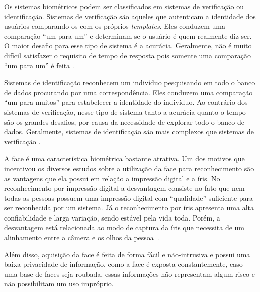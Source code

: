 Os sistemas biométricos podem ser classificados em sistemas de verificação ou identificação. Sistemas de verificação são aqueles que autenticam a identidade dos usuários comparando-os com os próprios \textit{templates}. Eles conduzem uma comparação ``um para um'' e determinam se o usuário é quem realmente diz ser. O maior desafio para esse tipo de sistema é a acurácia. Geralmente, não é muito difícil satisfazer o requisito de tempo de resposta pois somente uma comparação ``um para um'' é feita \cite{hong}.

Sistemas de identificação reconhecem um indivíduo pesquisando em todo o banco de dados procurando por uma correspondência. Eles conduzem uma comparação ``um para muitos'' para estabelecer a identidade do indivíduo. Ao contrário dos sistemas de verificação, nesse tipo de sistema tanto a acurácia quanto o tempo são os grandes desafios, por causa da necessidade de explorar todo o banco de dados. Geralmente, sistemas de identificação são mais complexos que sistemas de verificação \cite{hong}.

A face é uma característica biométrica bastante atrativa. Um dos motivos que incentivou os diversos estudos sobre a utilização da face para reconhecimento são as vantagens que ela possui em relação a impressão digital e a íris.  No reconhecimento por impressão digital a desvantagem consiste no fato que nem todas as pessoas possuem uma impressão digital com ``qualidade'' suficiente para ser reconhecida por um sistema. Já o reconhecimento por íris apresenta uma alta confiabilidade e larga variação, sendo estável pela vida toda. Porém, a desvantagem está relacionada ao modo de captura da íris que necessita de um alinhamento entre a câmera e os olhos da pessoa~\cite{saocarlos}. 

Além disso, aquisição da face é feita de forma fácil e não-intrusiva e possui uma baixa privacidade de informação, como a face é exposta constantemente, caso uma base de faces seja roubada, essas informações não representam algum risco e não possibilitam um uso impróprio.

















